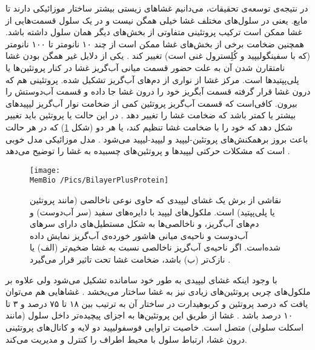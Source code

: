 در نتیجه‌ی توسعه‌ی تحقیقات، می‌دانیم غشا‌های زیستی بیشتر ساختار موزائیکی دارند تا مایع. یعنی در سلول‌های مختلف غشا خیلی همگن نیست و در یک سلول قسمت‌هایی از غشا ممکن است  ترکیب پروتئینی متفاوتی از بخش‌های دیگر همان سلول داشته باشد. همچنین ضخامت برخی از بخش‌های غشا ممکن است از چند ۱۰ نانومتر تا ۱۰۰ نانومتر (که با سفینگولیپید
و کُلِسترول غنی است) تغییر کند
\cite{Engelman:2005aa}. یکی از دلایل غیر همگن بودن غشا نامتقارن شدن آن به علت حضور قسمت میانی آب‌گریز غشا در کنار پروتئین‌ها یا پلی‌پپتیدها
است.  مرکز غشا از نواری از دم‌های آب‌گریز تشکیل شده. پروتئینی هم که درون غشا قرار گرفته قسمت آبگریز خود را درون غشا جا داده و قسمت آب‌دوستش را بیرون. کافی‌است که قسمت آب‌گریز پروتئین  کمی از ضخامت نوار آب‌گریز لیپید‌های  بیشتر یا کمتر باشد که ضخامت غشا را تغییر دهد
\cite{Mouritsen1984}. 
در این حالت یا پروتئین باید تغییر شکل دهد که خود را با ضخامت غشا تنظیم کند، یا هر دو (شکل 
\ref{fig:BilayerPlusProtein}) که در هر حالت باعث بروز برهمکنش‌‌های پروتئین-لیپید و لیپید-لیپید می‌شود
\cite{Huang1986,Aranda-Espinoza1996,Safran2000,Haselwandter2013,Haselwandter-Christoph2013}.
مدل موزائیکی مدل خوبی است که مشکلات حرکتی لیپید‌ها و پروتئین‌های چسبیده به غشا را توضیح می‌دهد
\cite{Simons2000,Simons1997}.


\begin{figure}[h]
\begin{center}
\texttt{[image: \\MemBio /Pics/BilayerPlusProtein]}
\caption{
نقاشی از برش یک غشای لیپیدی که حاوی نوعی ناخالصی (مانند پروتئین یا پلی‌پپتید) است. ملکول‌های لیپید با دایره‌های سفید (سر آب‌دوست) و دم‌های آب‌گریز، و  ناخالصی‌ها به شکل مستطیل‌های دارای سر‌های آب‌دوست و ناحیه‌ی میانی هاشور خورده‌ی آب‌گریز نمایش داده شده‌است. اگر ناحیه‌ی آب‌گریز ناخالصی نسبت به غشا ضخیم‌تر (الف) یا نازک‌تر (ب) باشد، ضخامت غشا تحت تاثیر قرار می‌گیرد
\cite{Mouritsen1984}
.
}
\label{fig:BilayerPlusProtein}
\end{center}
\end{figure}





با وجود اینکه غشای لیپیدی به طور خود سامانده تشکیل می‌شود ولی علاوه بر ملکول‌های چربی پروتئین‌های زیادی نیز به غشا ساختار می‌بخشد
\cite{wikiCellMembrane}. غشاهایی هم می‌توان یافت که درصد پروتئین و کربوهیدارت در ساختار  آن به ترتیب بین ۱۸ تا ۷۵ درصد و  ۳ تا ۱۰ درصد باشد
\cite{MembraneProteins1972}. 
غشا از طریق این پروتئین‌ها به اجزای پیچیده‌تر داخل سلول (مانند اسکلت سلولی) متصل است. خاصیت تراوایی فوسفولیپید دو لایه و کانال‌های پروتئینی درون غشا، ارتباط سلول با محیط اطراف را کنترل و مدیریت می‌کند.  

